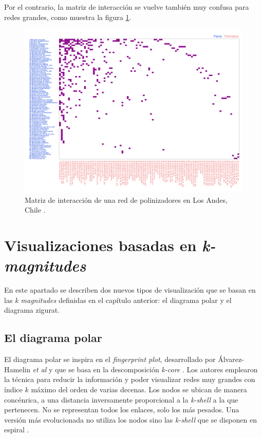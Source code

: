 Por el contrario, la matriz de interacción se vuelve también muy confusa para redes grandes, como muestra la figura \ref{fig:VIS_matrix_PL_001}.

\begin{figure}[h!]
\centering
\includegraphics[scale=0.4]{Figures/VIS_matrix_PL_001.png}
\caption{Matriz de interacción de una red de polinizadores en Los Andes, Chile \cite{arroyo1982community}.}
\label{fig:VIS_matrix_PL_001}
\end{figure}


\section{Visualizaciones basadas en \textit{k-magnitudes}}

En este apartado se describen dos nuevos tipos de visualización que se basan en las \textit{k magnitudes} definidas en el capítulo anterior: el diagrama polar y el diagrama zigurat.

\subsection{El diagrama polar}

El diagrama polar se inspira en el \textit{fingerprint plot}, desarrollado por Álvarez-Hamelin \textit{et al} y que se basa en la descomposición \textit{k-core} \cite{alvarez2005k}. Los autores emplearon la técnica para reducir la información y poder visualizar redes muy grandes con índice $k$ máximo del orden de varias decenas. Los nodos se ubican de manera concénrica, a una distancia inversamente proporcional a la \textit{k-shell} a la que pertenecen. No se representan todos los enlaces, solo los más pesados. Una versión más evolucionada no utiliza los nodos sino las \textit{k-shell} que se disponen en espiral \cite{barbera2015critical}.

